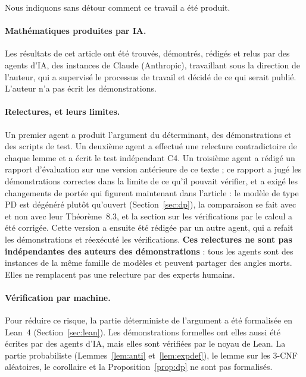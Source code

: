 \documentclass[11pt,a4paper]{article}
\theoremstyle{definition}
\theoremstyle{remark}
\begin{document}
Nous indiquons sans détour comment ce travail a été produit.

\paragraph{Mathématiques produites par IA.} Les résultats de cet article ont été trouvés,
démontrés, rédigés et relus par des agents d'IA, des instances de Claude (Anthropic),
travaillant sous la direction de l'auteur, qui a supervisé le processus de travail et décidé
de ce qui serait publié. L'auteur n'a pas écrit les démonstrations.

\paragraph{Relectures, et leurs limites.} Un premier agent a produit l'argument du
déterminant, des démonstrations et des scripts de test. Un deuxième agent a effectué une
relecture contradictoire de chaque lemme et a écrit le test indépendant C4. Un troisième
agent a rédigé un rapport d'évaluation sur une version antérieure de ce texte ; ce rapport a
jugé les démonstrations correctes dans la limite de ce qu'il pouvait vérifier, et a exigé
les changements de portée qui figurent maintenant dans l'article : le modèle de type PD est
dégénéré plutôt qu'\og ouvert\fg{} (Section~\ref{sec:dp}), la comparaison se fait avec
\cite[Théorème~8.1 et Lemme~8.2]{DL} et non avec leur Théorème~8.3, et la section sur les
vérifications par le calcul a été corrigée. Cette version a ensuite été rédigée par un autre
agent, qui a refait les démonstrations et réexécuté les vérifications.
\textbf{Ces relectures ne sont pas indépendantes des auteurs des démonstrations} : tous les
agents sont des instances de la même famille de modèles et peuvent partager des angles
morts. Elles ne remplacent pas une relecture par des experts humains.

\paragraph{Vérification par machine.} Pour réduire ce risque, la partie déterministe de
l'argument a été formalisée en Lean~4 (Section~\ref{sec:lean}). Les démonstrations formelles
ont elles aussi été écrites par des agents d'IA, mais elles sont vérifiées par le noyau de
Lean. La partie probabiliste (Lemmes~\ref{lem:anti} et~\ref{lem:expdef}), le lemme sur les
3-CNF aléatoires, le corollaire et la Proposition~\ref{prop:dp} ne sont pas formalisés.
\end{document}
